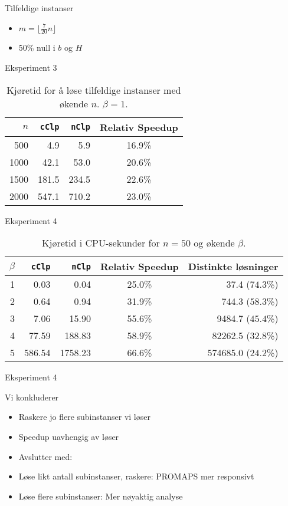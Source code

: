 \documentclass{beamer}
\begin{document}
\begin{frame}{Tilfeldige instanser}
\begin{itemize}
\item $m = \lfloor \frac{7}{20}n \rfloor$
\item 50\% null i $b$ og $H$
\end{itemize}
\end{frame}



\begin{frame}{Eksperiment 3}
\begin{table}[ht!]
    \centering
    \caption{Kjøretid for å løse tilfeldige instanser med økende $n$. $\beta = 1$.}
    \label{table:expfour}
\begin{tabular}{rrrc}
    $n$ & \texttt{cClp}  & \texttt{nClp}  & Relativ Speedup \\ \hline
    500 & 4.9   & 5.9   & 16.9\% \\
   1000 & 42.1  & 53.0  & 20.6\% \\
   1500 & 181.5 & 234.5 & 22.6\% \\
   2000 & 547.1 & 710.2 & 23.0\%
\end{tabular}
\end{table}
\end{frame}



\begin{frame}{Eksperiment 4}
\begin{table}[ht!]
\centering
\caption{Kjøretid i CPU-sekunder for $n = 50$ og økende $\beta$.}
\begin{tabular}{rrrcr}
      $\beta$ & \texttt{cClp} & \texttt{nClp} & Relativ Speedup & Distinkte løsninger\\ \hline
       1  & 0.03 & 0.04 & 25.0\% & 37.4 ($74.3$\%) \\
       2  & 0.64 & 0.94 & 31.9\% & 744.3 ($58.3$\%) \\
       3  & 7.06 & 15.90 & 55.6\% & 9484.7 ($45.4$\%) \\
       4  & 77.59 & 188.83 & 58.9\% & 82262.5 ($32.8$\%) \\
       5  & 586.54 & 1758.23 & 66.6\% & 574685.0 ($24.2$\%) \\
\end{tabular}
\label{table:exptwo}
\end{table}
\end{frame}



\begin{frame}{Eksperiment 4}

\end{frame}



\begin{frame}{Vi konkluderer}
\begin{itemize}
\item Raskere jo flere subinstanser vi løser
\item Speedup uavhengig av løser
\item Avslutter med:
\item Løse likt antall subinstanser, raskere: PROMAPS mer responsivt
\item Løse flere subinstanser: Mer nøyaktig analyse
\end{itemize}
\end{frame}
\end{document}
